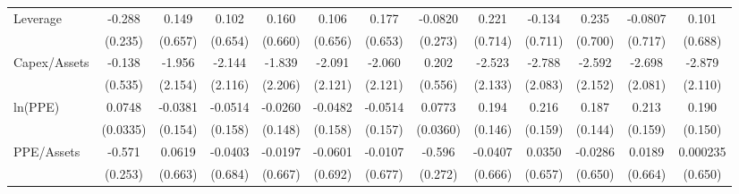 {\begin{tabular}{l*{12}{c}}
Leverage            &      -0.288         &       0.149         &       0.102         &       0.160         &       0.106         &       0.177         &     -0.0820         &       0.221         &      -0.134         &       0.235         &     -0.0807         &       0.101         \\
                    &     (0.235)         &     (0.657)         &     (0.654)         &     (0.660)         &     (0.656)         &     (0.653)         &     (0.273)         &     (0.714)         &     (0.711)         &     (0.700)         &     (0.717)         &     (0.688)         \\
Capex/Assets        &      -0.138         &      -1.956         &      -2.144         &      -1.839         &      -2.091         &      -2.060         &       0.202         &      -2.523         &      -2.788         &      -2.592         &      -2.698         &      -2.879         \\
                    &     (0.535)         &     (2.154)         &     (2.116)         &     (2.206)         &     (2.121)         &     (2.121)         &     (0.556)         &     (2.133)         &     (2.083)         &     (2.152)         &     (2.081)         &     (2.110)         \\
ln(PPE)             &      0.0748\sym{**} &     -0.0381         &     -0.0514         &     -0.0260         &     -0.0482         &     -0.0514         &      0.0773\sym{**} &       0.194         &       0.216         &       0.187         &       0.213         &       0.190         \\
                    &    (0.0335)         &     (0.154)         &     (0.158)         &     (0.148)         &     (0.158)         &     (0.157)         &    (0.0360)         &     (0.146)         &     (0.159)         &     (0.144)         &     (0.159)         &     (0.150)         \\
PPE/Assets          &      -0.571\sym{**} &      0.0619         &     -0.0403         &     -0.0197         &     -0.0601         &     -0.0107         &      -0.596\sym{**} &     -0.0407         &      0.0350         &     -0.0286         &      0.0189         &    0.000235         \\
                    &     (0.253)         &     (0.663)         &     (0.684)         &     (0.667)         &     (0.692)         &     (0.677)         &     (0.272)         &     (0.666)         &     (0.657)         &     (0.650)         &     (0.664)         &     (0.650)         \\

\end{tabular}}
